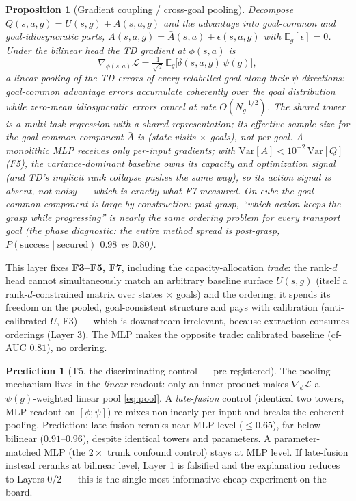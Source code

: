 \documentclass[11pt]{article}
\newcommand{\E}{\mathbb{E}}
\newtheorem{proposition}{Proposition}
\theoremstyle{definition}
\newtheorem{prediction}{Prediction}
\theoremstyle{remark}
\begin{document}
\begin{proposition}[Gradient coupling / cross-goal pooling]\label{prop:pooling}
Decompose $Q(s,a,g)=U(s,g)+A(s,a,g)$ and the advantage into goal-common and
goal-idiosyncratic parts, $A(s,a,g)=\bar A(s,a)+\epsilon(s,a,g)$ with
$\E_g[\epsilon]=0$. Under the bilinear head the TD gradient at $\phi(s,a)$ is
\begin{equation}
\nabla_{\phi(s,a)}\mathcal L=\tfrac{1}{\sqrt d}\,\E_{g}\big[\delta(s,a,g)\,\psi(g)\big],
\label{eq:pool}
\end{equation}
a \emph{linear} pooling of the TD errors of every relabelled goal along their
$\psi$-directions: goal-common advantage errors accumulate coherently over the goal
distribution while zero-mean idiosyncratic errors cancel at rate
$O(N_g^{-1/2})$. The shared tower is a multi-task regression with a shared representation;
its effective sample size for the goal-common component $\bar A$ is (state-visits
$\times$ goals), not per-goal. A monolithic MLP receives only per-input gradients; with
$\mathrm{Var}[A]<10^{-2}\,\mathrm{Var}[Q]$ (F5), the variance-dominant baseline owns its
capacity and optimization signal (and TD's implicit rank collapse pushes the same way), so
its action signal is \emph{absent}, not noisy --- which is exactly what F7 measured. On cube
the goal-common component is large by construction: post-grasp, ``which action keeps the
grasp while progressing'' is nearly the same ordering problem for every transport goal (the
phase diagnostic: the entire method spread is post-grasp,
$P(\mathrm{success}\mid\mathrm{secured})$ $0.98$ vs $0.80$).
\end{proposition}

This layer fixes \textbf{F3--F5, F7}, including the capacity-allocation \emph{trade}: the
rank-$d$ head cannot simultaneously match an arbitrary baseline surface $U(s,g)$ (itself a
rank-$d$-constrained matrix over states $\times$ goals) and the ordering; it spends its
freedom on the pooled, goal-consistent structure and pays with calibration
(anti-calibrated $U$, F3) --- which is downstream-irrelevant, because extraction consumes
orderings (Layer 3). The MLP makes the opposite trade: calibrated baseline (cf-AUC $0.81$),
no ordering.

\begin{prediction}[T5, the discriminating control --- pre-registered]\label{pred:t5}
The pooling mechanism lives in the \emph{linear} readout: only an inner product makes
$\nabla_\phi\mathcal L$ a $\psi(g)$-weighted linear pool \eqref{eq:pool}. A
\emph{late-fusion} control (identical two towers, MLP readout on $[\phi;\psi]$) re-mixes
nonlinearly per input and breaks the coherent pooling. Prediction: late-fusion reranks near
MLP level ($\le0.65$), far below bilinear ($0.91$--$0.96$), despite identical towers and
parameters. A parameter-matched MLP (the $2\times$ trunk confound control) stays at MLP
level. If late-fusion instead reranks at bilinear level, Layer 1 is falsified and the
explanation reduces to Layers 0/2 --- this is the single most informative cheap experiment
on the board.
\end{prediction}
\end{document}

